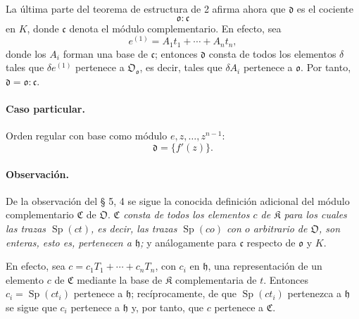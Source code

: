 La última parte del teorema de estructura de 2 afirma ahora que $\mathfrak d$ es el cociente
\[
\mathfrak o:\mathfrak c
\]
en $K$, donde $\mathfrak c$ denota el módulo complementario. En efecto, sea
\[
e^{(1)}=A_1t_1+\cdots+A_nt_n,
\]
donde los $A_i$ forman una base de $\mathfrak c$; entonces $\mathfrak d$ consta de todos los elementos $\delta$ tales que $\delta e^{(1)}$ pertenece a $\mathfrak O_{\mathfrak o}$, es decir, tales que $\delta A_i$ pertenece a $\mathfrak o$. Por tanto, $\mathfrak d=\mathfrak o:\mathfrak c$.

\paragraph{Caso particular.}
Orden regular con base como módulo $e,z,\ldots,z^{n-1}$:
\[
\mathfrak d=\{f'(z)\}.
\]

\paragraph{Observación.}
De la observación del § 5, 4 se sigue la conocida definición adicional del módulo complementario $\mathfrak C$ de $\mathfrak O$. \emph{$\mathfrak C$ consta de todos los elementos $c$ de $\mathfrak K$ para los cuales las trazas $\operatorname{Sp}(ct)$, es decir, las trazas $\operatorname{Sp}(co)$ con $o$ arbitrario de $\mathfrak O$, son enteras, esto es, pertenecen a $\mathfrak h$;} y análogamente para $\mathfrak c$ respecto de $\mathfrak o$ y $K$.

En efecto, sea $c=c_1T_1+\cdots+c_nT_n$, con $c_i$ en $\mathfrak h$, una representación de un elemento $c$ de $\mathfrak C$ mediante la base de $\mathfrak K$ complementaria de $t$. Entonces $c_i=\operatorname{Sp}(ct_i)$ pertenece a $\mathfrak h$; recíprocamente, de que $\operatorname{Sp}(ct_i)$ pertenezca a $\mathfrak h$ se sigue que $c_i$ pertenece a $\mathfrak h$ y, por tanto, que $c$ pertenece a $\mathfrak C$.

